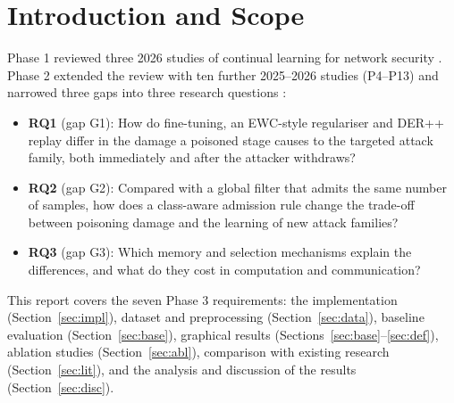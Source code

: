 \documentclass[10pt,a4paper]{article}
\begin{document}
\section{Introduction and Scope}
Phase 1 reviewed three 2026 studies of continual learning for network security \cite{ge,wu,luo}. Phase 2 extended the review with ten further 2025--2026 studies (P4--P13) and narrowed three gaps into three research questions \cite{phase1}:
\begin{itemize}
\item \textbf{RQ1} (gap G1): How do fine-tuning, an EWC-style regulariser and DER++ replay differ in the damage a poisoned stage causes to the targeted attack family, both immediately and after the attacker withdraws?
\item \textbf{RQ2} (gap G2): Compared with a global filter that admits the same number of samples, how does a class-aware admission rule change the trade-off between poisoning damage and the learning of new attack families?
\item \textbf{RQ3} (gap G3): Which memory and selection mechanisms explain the differences, and what do they cost in computation and communication?
\end{itemize}
This report covers the seven Phase 3 requirements: the implementation (Section~\ref{sec:impl}), dataset and preprocessing (Section~\ref{sec:data}), baseline evaluation (Section~\ref{sec:base}), graphical results (Sections~\ref{sec:base}--\ref{sec:def}), ablation studies (Section~\ref{sec:abl}), comparison with existing research (Section~\ref{sec:lit}), and the analysis and discussion of the results (Section~\ref{sec:disc}).
\end{document}
